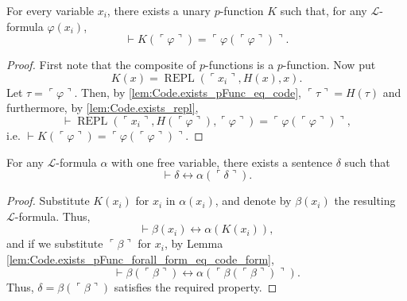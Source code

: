 \begin{lemma}
    \label{lem:Code.exists_pFunc_forall_form_eq_code_form}
    \leanok
    For every variable $x_i$, there exists a unary $p$-function $K$ such that, 
    for any $\mathcal{L}$-formula $\varphi(x_i)$,
    $$
    \vdash K (\ulcorner{\varphi}\urcorner) = 
    \ulcorner{\varphi(\ulcorner {\varphi} \urcorner)}\urcorner.
    $$
\end{lemma}

\begin{proof}
    First note that the composite of $p$-functions is a $p$-function.
    Now put
    $$
    K(x) = \operatorname{REPL}(\ulcorner{x_i}\urcorner, H(x), x).
    $$
    Let $\tau = \ulcorner{\varphi}\urcorner$.
    Then, by \ref{lem:Code.exists_pFunc_eq_code}, $\ulcorner{\tau}\urcorner = H (\tau)$ and
    furthermore, by \ref{lem:Code.exists_repl},
    $$
    \vdash \operatorname{REPL}(\ulcorner{x_i}\urcorner, H(\ulcorner{\varphi}\urcorner), 
    \ulcorner{\varphi}\urcorner) = \ulcorner{\varphi(\ulcorner {\varphi} \urcorner)}\urcorner,
    $$
    i.e. $\vdash K (\ulcorner{\varphi}\urcorner)=
    \ulcorner{\varphi(\ulcorner {\varphi} \urcorner)}\urcorner$.
\end{proof}

\begin{theorem}
    \label{thm:diagonal}
    \leanok
    For any $\mathcal{L}$-formula $\alpha$ with one free variable, 
    there exists a sentence $\delta$ such that 
    $$
    \vdash \delta \leftrightarrow \alpha(\ulcorner{\delta}\urcorner).
    $$
\end{theorem}

\begin{proof}
    Substitute $K(x_i)$ for $x_i$ in $\alpha(x_i)$, 
    and denote by $\beta(x_i)$ the resulting $\mathcal{L}$-formula.
    Thus,
    $$
    \vdash \beta(x_i) \leftrightarrow \alpha(K(x_i)),
    $$
    and if we substitute $\ulcorner{\beta}\urcorner$ for $x_i$, 
    by Lemma \ref{lem:Code.exists_pFunc_forall_form_eq_code_form},
    $$
    \vdash \beta(\ulcorner{\beta}\urcorner) \leftrightarrow 
    \alpha(\ulcorner{\beta(\ulcorner{\beta}\urcorner)}\urcorner).
    $$
    Thus, $\delta = \beta(\ulcorner{\beta}\urcorner)$ satisfies the required property.
\end{proof}

